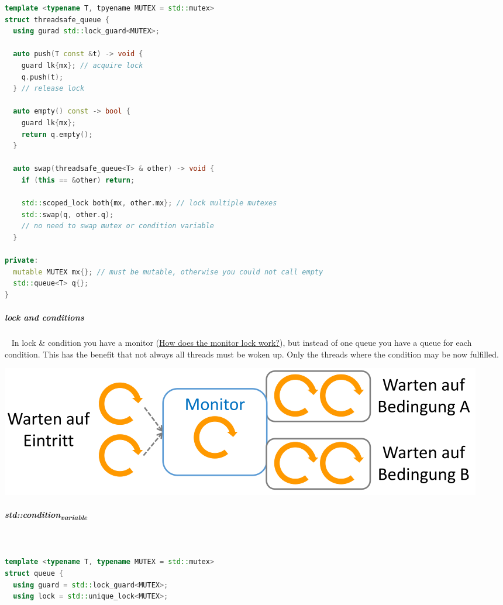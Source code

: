 \documentclass[11pt,twoside,landscape]{article}
\begin{document}
\begin{multicols}{2}
\begin{lstlisting}[language=c++,label=lst:example-usage-for-raii-wrappers,caption={Example usage for RAII wrappers},captionpos=b,numbers=none]
template <typename T, tpyename MUTEX = std::mutex>
struct threadsafe_queue {
  using gurad std::lock_guard<MUTEX>;

  auto push(T const &t) -> void {
    guard lk{mx}; // acquire lock
    q.push(t);
  } // release lock

  auto empty() const -> bool {
    guard lk{mx};
    return q.empty();
  }

  auto swap(threadsafe_queue<T> & other) -> void {
    if (this == &other) return;

    std::scoped_lock both{mx, other.mx}; // lock multiple mutexes
    std::swap(q, other.q);
    // no need to swap mutex or condition variable
  }

private:
  mutable MUTEX mx{}; // must be mutable, otherwise you could not call empty
  std::queue<T> q{};
}
\end{lstlisting}

\subparagraph{lock and conditions} \
\label{sec:orgb894030}
In lock \& condition you have a monitor (\href{../../../roam/20220315074811-how_does_the_monitor_lock_work.org}{How does the monitor lock work?}), but instead of one queue you have a queue for each condition.
This has the benefit that not always all threads must be woken up.
Only the threads where the condition may be now fulfilled.


{
\begin{center}
\includegraphics[width=.9\linewidth]{img/lock_and_conditions.png}
\end{center}
\label{fig:lock-and-conditions}
}
\subparagraph{std::condition\textsubscript{variable}} \
\label{sec:orgd4b4813}
\begin{lstlisting}[language=c++,label=lst:example-usage-std-condition_variable,caption={Example usage std::condition\textsubscript{variable}},captionpos=b,numbers=none]
template <typename T, typename MUTEX = std::mutex>
struct queue {
  using guard = std::lock_guard<MUTEX>;
  using lock = std::unique_lock<MUTEX>;


\end{lstlisting}
\end{multicols}
\end{document}
